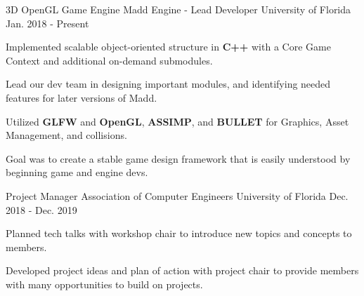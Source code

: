


\begin{cventries}
	
\cventry
{3D OpenGL Game Engine} %
{Madd Engine - Lead Developer} %
{University of Florida} %
{Jan. 2018 - Present} %
{ %
	\begin{cvitems}
		\setlength{\itemindent}{.125in}
		\item {Implemented scalable object-oriented structure in \textbf{C++} with a Core Game Context and additional on-demand submodules.}
		\item {Lead our dev team in designing important modules, and identifying needed features for later versions of Madd.}
		\item {Utilized \textbf{GLFW} and \textbf{OpenGL}, \textbf{ASSIMP}, and \textbf{BULLET} for Graphics, Asset Management, and collisions.}
		\item {Goal was to create a stable game design framework that is easily understood by beginning game and engine devs.}
	\end{cvitems}
}


\cventry
{Project Manager} %
{Association of Computer Engineers} %
{University of Florida} %
{Dec. 2018 - Dec. 2019} %
{ %
	\begin{cvitems}
		\setlength{\itemindent}{.125in}
		\item {Planned tech talks with workshop chair to introduce new topics and concepts to members.}
		\item {Developed project ideas and plan of action with project chair to provide members with many opportunities to build on projects.}
	\end{cvitems}
}


\end{cventries}
